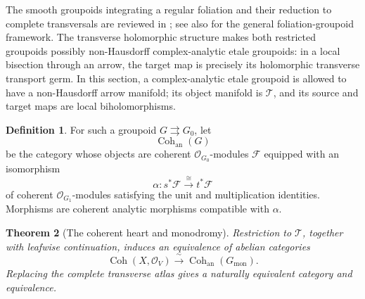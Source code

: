 \documentclass[12pt]{amsart}
\newtheorem{thm}{Theorem}[section]
\theoremstyle{definition}
\newtheorem{defn}[thm]{Definition}
\theoremstyle{remark}
\numberwithin{equation}{section}
\newcommand{\CO}{\mathcal O}
\begin{document}
The smooth groupoids integrating a regular foliation and their reduction to
complete transversals are reviewed in
\cite[Section~1, Theorem~1 and Proposition~1]{CrainicMoerdijk2001}; see also
\cite{MoerdijkMrcun2003} for the general foliation-groupoid framework.
The transverse holomorphic structure makes both restricted groupoids
possibly non-Hausdorff complex-analytic etale groupoids: in a local
bisection through an arrow, the target map is precisely its holomorphic
transverse transport germ.  In this section, a complex-analytic etale
groupoid is allowed to have a non-Hausdorff arrow manifold; its object
manifold is \(\mathcal T\), and its source and target maps are local
biholomorphisms.

\begin{defn}
For such a groupoid \(G\rightrightarrows G_0\), let
\[
\operatorname{Coh}_{\mathrm{an}}(G)
\]
be the category whose objects are coherent \(\CO_{G_0}\)-modules
\(\mathcal F\) equipped with an isomorphism
\[
\alpha:s^*\mathcal F\xrightarrow{\ \cong\ }t^*\mathcal F
\]
of coherent \(\CO_{G_1}\)-modules satisfying the unit and multiplication
identities.  Morphisms are coherent analytic morphisms compatible with
\(\alpha\).
\end{defn}

\begin{thm}[The coherent heart and monodromy]
\label{thm:coherent-monodromy}
Restriction to \(\mathcal T\), together with leafwise continuation, induces
an equivalence of abelian categories
\[
\operatorname{Coh}(X,\CO_V)
\xrightarrow{\ \sim\ }
\operatorname{Coh}_{\mathrm{an}}(G_{\mathrm{mon}}).
\]
Replacing the complete transverse atlas gives a naturally equivalent
category and equivalence.
\end{thm}
\end{document}
